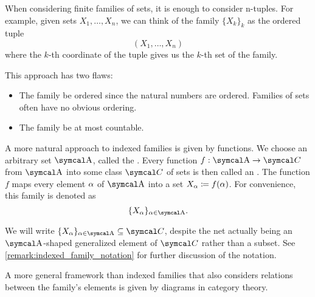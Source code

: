 \begin{definition}\label{def:indexed_family}
  When considering finite families of sets, it is enough to consider n-tuples. For example, given sets \( X_1, \ldots, X_n \), we can think of the family \( \{ X_k \}_k \) as the ordered tuple
  \begin{equation*}
    (X_1, \ldots, X_n)
  \end{equation*}
  where the \( k \)-th coordinate of the tuple gives us the \( k \)-th set of the family.

  This approach has two flaws:
  \begin{itemize}
    \item The family  be ordered since the natural numbers are ordered. Families of sets often have no obvious ordering.
    \item The family  be at most countable.
  \end{itemize}

  A more natural approach to indexed families is given by functions. We choose an arbitrary set \( \CA \), called the . Every function \( f: \CA \to \Cal C \) from \( \CA \) into some class \( \Cal C \) of sets is then called an . The function \( f \) maps every element \( \alpha \) of \( \CA \) into a set \( X_\alpha \coloneqq f(\alpha) \). For convenience, this family is denoted as
  \begin{equation*}
    \{ X_\al \}_{\al \in \CA}.
  \end{equation*}

  We will write \( \{ X_\al \}_{\al \in \CA} \subseteq \Cal{C} \), despite the net actually being an \( \CA \)-shaped generalized element of \( \Cal{C} \) rather than a subset. See \cref{remark:indexed_family_notation} for further discussion of the notation.

  A more general framework than indexed families that also considers relations between the family's elements is given by diagrams in category theory.
\end{definition}


